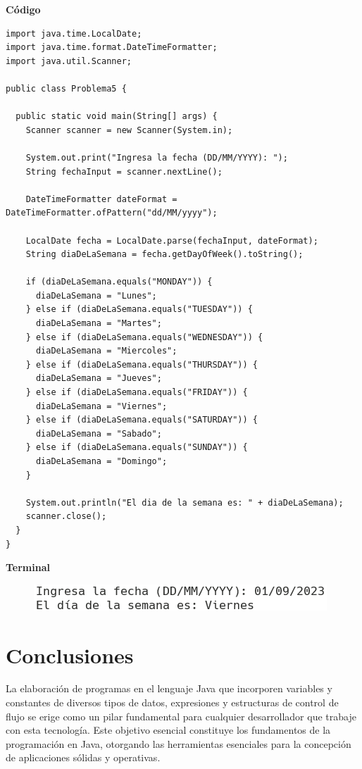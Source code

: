 \documentclass[11pt, twocolumn]{article}
\begin{document}
  \textbf{Código}
  \begin{lstlisting}
import java.time.LocalDate;
import java.time.format.DateTimeFormatter;
import java.util.Scanner;

public class Problema5 {

  public static void main(String[] args) {
    Scanner scanner = new Scanner(System.in);

    System.out.print("Ingresa la fecha (DD/MM/YYYY): ");
    String fechaInput = scanner.nextLine();

    DateTimeFormatter dateFormat = DateTimeFormatter.ofPattern("dd/MM/yyyy");

    LocalDate fecha = LocalDate.parse(fechaInput, dateFormat);
    String diaDeLaSemana = fecha.getDayOfWeek().toString();
    
    if (diaDeLaSemana.equals("MONDAY")) {
      diaDeLaSemana = "Lunes";
    } else if (diaDeLaSemana.equals("TUESDAY")) {
      diaDeLaSemana = "Martes";
    } else if (diaDeLaSemana.equals("WEDNESDAY")) {
      diaDeLaSemana = "Miercoles";
    } else if (diaDeLaSemana.equals("THURSDAY")) {
      diaDeLaSemana = "Jueves";
    } else if (diaDeLaSemana.equals("FRIDAY")) {
      diaDeLaSemana = "Viernes";
    } else if (diaDeLaSemana.equals("SATURDAY")) {
      diaDeLaSemana = "Sabado";
    } else if (diaDeLaSemana.equals("SUNDAY")) {
      diaDeLaSemana = "Domingo";
    }
    
    System.out.println("El dia de la semana es: " + diaDeLaSemana);
    scanner.close();
  }
}
  \end{lstlisting}

  \textbf{Terminal}
  \begin{figure}[ht]
    \includegraphics[width=0.75\columnwidth, center]{P5.png}
  \end{figure}


  \section*{Conclusiones}
  La elaboración de programas en el lenguaje Java que incorporen variables y constantes de diversos tipos de datos, expresiones y estructuras de control de flujo se erige como un pilar fundamental para cualquier desarrollador que trabaje con esta tecnología. Este objetivo esencial constituye los fundamentos de la programación en Java, otorgando las herramientas esenciales para la concepción de aplicaciones sólidas y operativas.
\end{document}

